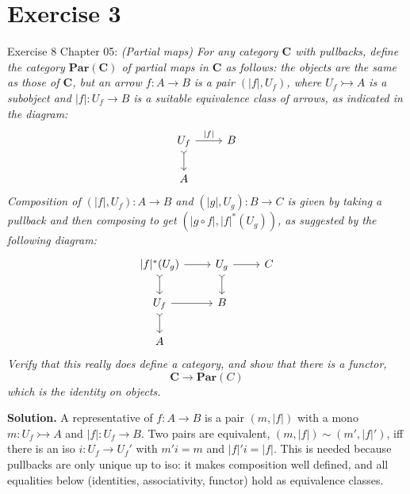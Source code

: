 \documentclass[11pt]{article}
\begin{document}
\section{Exercise 3}

Exercise 8 Chapter 05: \textit{
  (Partial maps) For any category $\mathbf{C}$ with pullbacks, define the
  category $\textbf{Par}(\mathbf{C})$ of partial maps in $\mathbf{C}$ as
  follows: the objects are the same as those of $\mathbf{C}$, but an arrow $f:
  A \rightarrow B$ is a pair $(|f|,U_{f})$, where $U_{f} \rightarrowtail A$ is
  a subobject and $|f|: U_{f} \rightarrow B$ is a suitable equivalence class of
  arrows, as indicated in the diagram:
}
\[
\begin{tikzcd}
  U_{f} \ar[r, "\lvert f \rvert"] \ar[d, >->] & B \\
  A &
\end{tikzcd}
\]
\textit{
  Composition of $(\lvert f \rvert,U_{f}): A \rightarrow B$ and $(\lvert g
  \rvert,U_{g}): B \rightarrow C$ is given by taking a pullback and then
  composing to get $(\lvert g \circ f \rvert, \lvert f \rvert^{*}(U_{g}))$, as suggested by the
  following diagram:
}
\[
\begin{tikzcd}
  \lvert f \rvert^{*} (U_{g}) \ar[r] \ar[d, >->] & U_{g} \ar[r] \ar[d, >->] & C \\
  U_{f} \ar[r] \ar[d, >->] & B & \\
  A & &
\end{tikzcd}
\]
\textit{
  Verify that this really does define a category, and show that there is a
  functor,
  $$\mathbf{C} \rightarrow \textbf{Par}(C)$$
  which is the identity on objects.
}

\medskip
\textbf{Solution.} A representative of $f : A \to B$ is a pair $(m, |f|)$ with
a mono $m : U_f \rightarrowtail A$ and $|f| : U_f \to B$. Two pairs are
equivalent, $(m,|f|) \sim (m',|f|')$, iff there is an iso $i : U_f \to U_f'$
with $m' i = m$ and $|f|' i = |f|$. This is needed because pullbacks are only
unique up to iso: it makes composition well defined, and all equalities below
(identities, associativity, functor) hold as equivalence classes.
\end{document}
